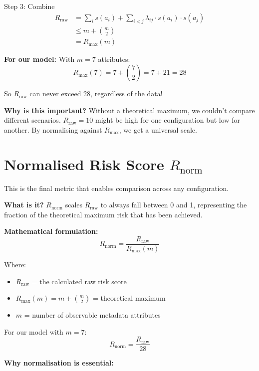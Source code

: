 \documentclass[12pt,a4paper,oneside,openany]{report}
\newcommand{\Rnorm}{R_{\mathrm{norm}}}
\newcommand{\Rraw}{R_{\mathrm{raw}}}
\newcommand{\Rmax}{R_{\mathrm{max}}}
\begin{document}
Step 3: Combine
\begin{align}
\Rraw &= \sum_{i} s(a_i) + \sum_{i<j} \lambda_{ij} \cdot s(a_i) \cdot s(a_j) \\
&\leq m + \binom{m}{2} \\
&= \Rmax(m)
\end{align}

\textbf{For our model:} With $m = 7$ attributes:
\begin{equation}
\Rmax(7) = 7 + \binom{7}{2} = 7 + 21 = 28
\end{equation}

So $R_{\mathrm{raw}}$ can never exceed 28, regardless of the data!

\textbf{Why is this important?} Without a theoretical maximum, we couldn't compare different scenarios. $R_{\mathrm{raw}} = 10$ might be high for one configuration but low for another. By normalising against $R_{\mathrm{max}}$, we get a universal scale.

\section{Normalised Risk Score $R_{\mathrm{norm}}$}
\label{sec:norm}

This is the final metric that enables comparison across any configuration.

\textbf{What is it?} $R_{\mathrm{norm}}$ scales $R_{\mathrm{raw}}$ to always fall between 0 and 1, representing the fraction of the theoretical maximum risk that has been achieved.

\textbf{Mathematical formulation:}
\begin{equation}
\Rnorm = \frac{\Rraw}{\Rmax(m)}
\end{equation}

Where:
\begin{itemize}
    \item $\Rraw$ = the calculated raw risk score
    \item $\Rmax(m) = m + \binom{m}{2}$ = theoretical maximum
    \item $m$ = number of observable metadata attributes
\end{itemize}

For our model with $m = 7$:
\begin{equation}
\Rnorm = \frac{\Rraw}{28}
\end{equation}

\textbf{Why normalisation is essential:}
\end{document}
